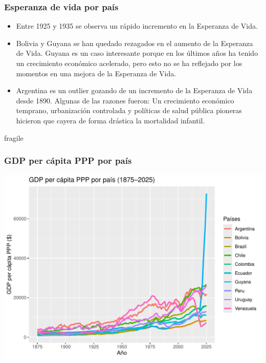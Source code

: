 \documentclass{beamer}
\begin{document}
\begin{frame}[fragile]
\frametitle{Esperanza de vida por país}
\begin{itemize}
\item<1> Entre 1925 y 1935 se observa un rápido incremento en la Esperanza de Vida.
\item<2> Bolivia y Guyana se han quedado rezagados en el aumento de la Esperanza de Vida. Guyana es un caso interesante porque en los últimos años ha tenido un crecimiento económico acelerado, pero esto no se ha reflejado por los momentos en una mejora de la Esperanza de Vida.
\item<3> Argentina es un outlier gozando de un incremento de la Esperanza de Vida desde 1890. Algunas de las razones fueron: Un crecimiento económico temprano, urbanización controlada y políticas de salud pública pioneras hicieron que cayera de forma drástica la mortalidad infantil.
\end{itemize}
\end{frame}


\begin{frame}{fragile}
\frametitle{GDP per cápita PPP por país}
\includegraphics{presentacion_Parada_G_M8R2-004}
\end{frame}
\end{document}
